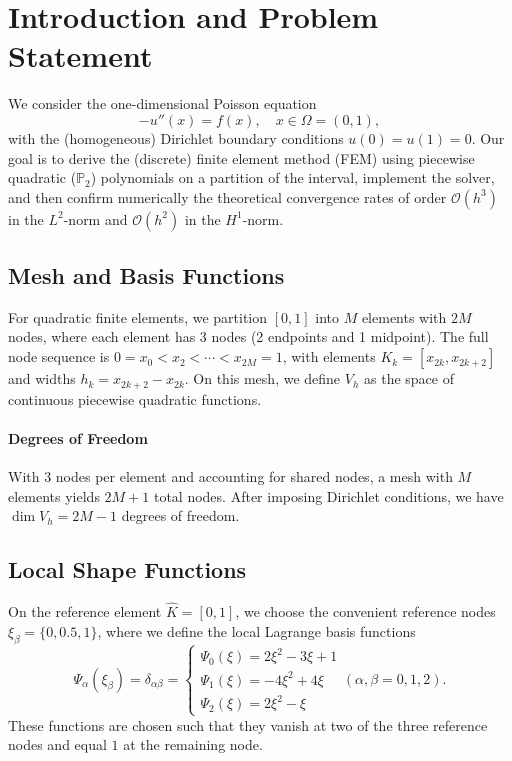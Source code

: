 \documentclass[a4paper,10pt]{article}
\begin{document}

\clearpage

\section{Introduction and Problem Statement}
We consider the one-dimensional Poisson equation
\[
	-u''(x) = f(x), \quad x \in \Omega=(0,1),
\]
with the (homogeneous) Dirichlet boundary conditions \(u(0)=u(1)=0\).
Our goal is to derive the (discrete) finite element method (FEM) using piecewise quadratic (\(\mathbb{P}_2\)) polynomials on a partition of the interval, implement the solver, and then confirm numerically the theoretical convergence rates of order \(\mathcal{O}(h^3)\) in the \(L^2\)-norm and \(\mathcal{O}(h^2)\) in the \(H^1\)-norm.

\subsection{Mesh and Basis Functions}
For quadratic finite elements, we partition $[0,1]$ into $M$ elements with $2M$ nodes, where each element has 3 nodes (2 endpoints and 1 midpoint).
The full node sequence is $0 = x_0 < x_2 < \cdots < x_{2M} = 1$, with elements $K_k = [x_{2k},x_{2k+2}]$ and widths $h_k = x_{2k+2} - x_{2k}$.
On this mesh, we define $V_h$ as the space of continuous piecewise quadratic functions.

\paragraph{Degrees of Freedom} With 3 nodes per element and accounting for shared nodes, a mesh with $M$ elements yields $2M+1$ total nodes. After imposing Dirichlet conditions, we have $\dim V_h = 2M-1$ degrees of freedom.

\subsection{Local Shape Functions}
On the reference element $\widehat{K}=[0,1]$, we choose the convenient reference nodes \(\xi_\beta=\{0,0.5,1\}\), where we define the local Lagrange basis functions
\[
	\Psi_{\alpha}(\xi_{\beta})
	= \delta_{\alpha\beta} =
	\begin{cases}
		\Psi_0(\xi) = 2\xi^2-3\xi+1 \\
		\Psi_1(\xi) = -4\xi^2+4\xi  \\
		\Psi_2(\xi) = 2\xi^2-\xi
	\end{cases} (\alpha,\beta=0,1,2).
\]
These functions are chosen such that they vanish at two of the three reference nodes and equal $1$ at the remaining node.
\end{document}
